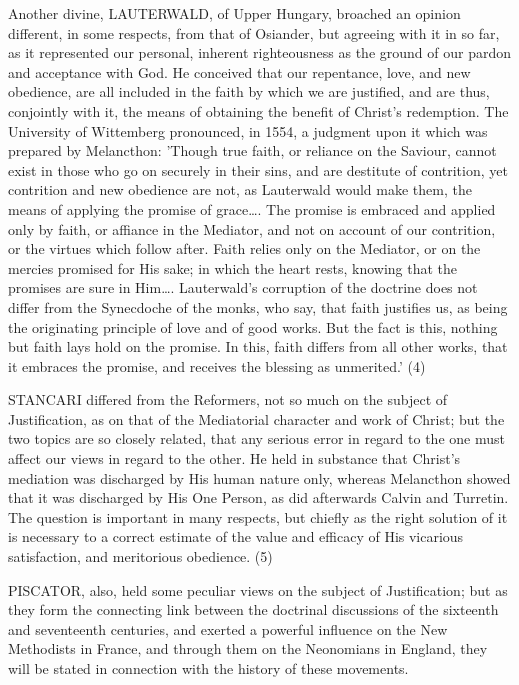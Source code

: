 \documentclass[
]{book}
\begin{document}
Another divine, LAUTERWALD, of Upper Hungary, broached an opinion different, in some respects, from that of Osiander, but agreeing with it in so far, as it represented our personal, inherent righteousness as the ground of our pardon and acceptance with God. He conceived that our repentance, love, and new obedience, are all included in the faith by which we are justified, and are thus, conjointly with it, the means of obtaining the benefit of Christ's redemption. The University of Wittemberg pronounced, in 1554, a judgment upon it which was prepared by Melancthon: 'Though true faith, or reliance on the Saviour, cannot exist in those who go on securely in their sins, and are destitute of contrition, yet contrition and new obedience are not, as Lauterwald would make them, the means of applying the promise of grace\ldots. The promise is embraced and applied only by faith, or affiance in the Mediator, and not on account of our contrition, or the virtues which follow after. Faith relies only on the Mediator, or on the mercies promised for His sake; in which the heart rests, knowing that the promises are sure in Him\ldots. Lauterwald's corruption of the doctrine does not differ from the Synecdoche of the monks, who say, that faith justifies us, as being the originating principle of love and of good works. But the fact is this, nothing but faith lays hold on the promise. In this, faith differs from all other works, that it embraces the promise, and receives the blessing as unmerited.' (4)

STANCARI differed from the Reformers, not so much on the subject of Justification, as on that of the Mediatorial character and work of Christ; but the two topics are so closely related, that any serious error in regard to the one must affect our views in regard to the other. He held in substance that Christ's mediation was discharged by His human nature only, whereas Melancthon showed that it was discharged by His One Person, as did afterwards Calvin and Turretin. The question is important in many respects, but chiefly as the right solution of it is necessary to a correct estimate of the value and efficacy of His vicarious satisfaction, and meritorious obedience. (5)

PISCATOR, also, held some peculiar views on the subject of Justification; but as they form the connecting link between the doctrinal discussions of the sixteenth and seventeenth centuries, and exerted a powerful influence on the New Methodists in France, and through them on the Neonomians in England, they will be stated in connection with the history of these movements.
\end{document}
